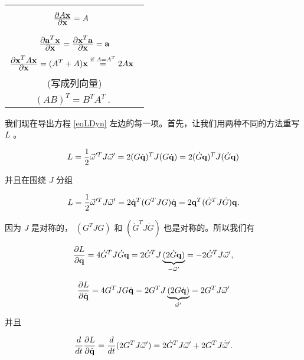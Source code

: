\begin{center}
\begin{tabular}{c}
$\frac{\displaystyle \partial A\mathbf{x}}{\displaystyle \partial \mathbf{x}} = A      \phantom{\Bigg(}$ \\
$\frac{\displaystyle \partial \mathbf{a}^T\mathbf{x}}{\displaystyle \partial \mathbf{x}} = \frac{\displaystyle \partial \mathbf{x}^T\mathbf{a}}{\displaystyle \partial \mathbf{x}} = \mathbf{a}$ \\
$\frac{\displaystyle \partial \mathbf{x}^T A\mathbf{x}}{\displaystyle \partial \mathbf{x}} = (A^T +A)\mathbf{x} \stackrel{\textrm{if }A=A^T}{=} 2A\mathbf{x}     \phantom{\Big(}$ \\
(写成列向量)\\
$(AB)^T=B^TA^T \ .  \phantom{\Bigg(}$\\
\end{tabular}
\end{center}

我们现在导出方程 \eqref{eqLDyn} 左边的每一项。首先，让我们用两种不同的方法重写 $L$ 。
 

\begin{equation*}
L=\frac{1}{2}\vec{\omega}'^TJ\vec{\omega}' = 2(G\dot{\mathbf{q}})^T J (G\dot{\mathbf{q}}) = 2 (\dot{G}\mathbf{q})^T J (\dot{G}\mathbf{q})
\end{equation*}

并且在围绕 $J$ 分组

\begin{equation*}
L=\frac{1}{2}\vec{\omega}'^TJ\vec{\omega}' = 2\dot{\mathbf{q}}^T (G^T J G) \dot{\mathbf{q}} = 2 \mathbf{q}^T (\dot{G}^T J \dot{G}) \mathbf{q}.
\end{equation*}

因为 $J$ 是对称的， $(G^T J G)$ 和 $(\dot{G}^T J \dot{G})$ 也是对称的。所以我们有

\begin{equation}
\frac{\partial L}{\partial \mathbf{q}} = 4 \dot{G}^T J \dot{G} \mathbf{q} = 2 \dot{G}^T J \underbrace{(2\dot{G}\mathbf{q})}_{-\vec{\omega}'} =
-2 \dot{G}^T J \vec{\omega}',
\end{equation}

\begin{equation*}
\frac{\partial L}{\partial \dot{\mathbf{q}}} = 4 G^T J G \dot{\mathbf{q}} = 2 G^T J \underbrace{(2G\dot{\mathbf{q}})}_{\vec{\omega}'} =
2 G^T J \vec{\omega}'
\end{equation*}

并且

\begin{equation}
\frac{d}{dt} \frac{\partial L}{\partial \dot{\mathbf{q}}} = \frac{d}{dt} (2 G^T J \vec{\omega}') = 2 \dot{G}^T J \vec{\omega}' + 2 G^T J \dot{\vec{\omega}}'.
\end{equation}


